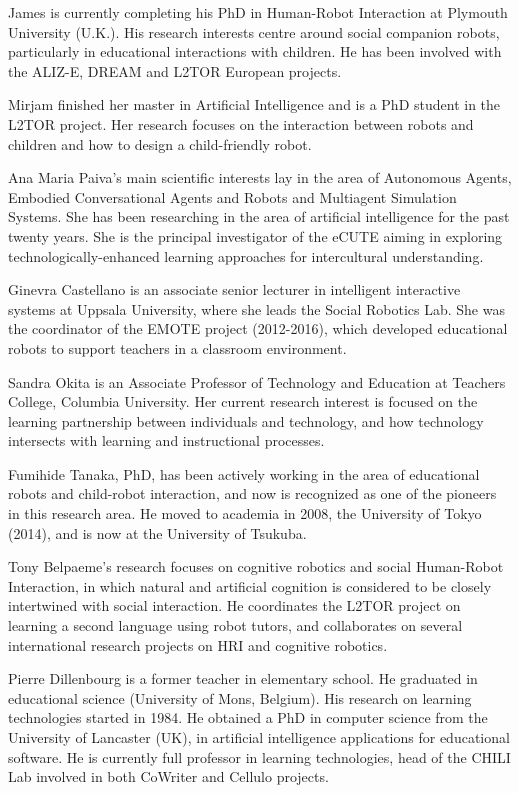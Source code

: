 \documentclass{sig-alternate-05-2015}
\begin{document}
James is currently completing his PhD in Human-Robot Interaction at Plymouth University (U.K.). His research interests centre around social companion robots, particularly in educational interactions with children. He has been involved with the ALIZ-E, DREAM and L2TOR European projects.


Mirjam finished her master in Artificial Intelligence and is a PhD student in the L2TOR project. Her research focuses on the interaction between robots and children and how to design a child-friendly robot.

Ana Maria Paiva's main scientific interests lay in the area of Autonomous Agents, Embodied Conversational Agents and Robots and Multiagent Simulation Systems. She has been researching in the area of artificial intelligence for the past twenty years. She is the principal investigator of the eCUTE aiming in exploring technologically-enhanced learning approaches for intercultural understanding.

Ginevra Castellano is an associate senior lecturer in intelligent interactive systems at Uppsala University, where she leads the Social Robotics Lab. She was the coordinator of the EMOTE project (2012-2016), which developed educational robots to support teachers in a classroom environment.


Sandra Okita is an Associate Professor of Technology and Education at Teachers College, Columbia University. Her current research interest is focused on the learning partnership between individuals and technology, and how technology intersects with learning and instructional processes.

Fumihide Tanaka, PhD,  has been actively working in the area of educational robots and child-robot interaction, and now is recognized as one of the pioneers in this research area. He moved to academia in 2008, the University of Tokyo (2014), and is now at the University of Tsukuba.

Tony Belpaeme's research focuses on cognitive robotics and social Human-Robot Interaction, in which natural and artificial cognition is considered to be closely intertwined with social interaction. He coordinates the L2TOR project on learning a second language using robot tutors, and collaborates on several international research projects on HRI and cognitive robotics.

Pierre Dillenbourg is a former teacher in elementary school. He graduated in educational science (University of Mons, Belgium). His research on learning technologies started in 1984. He obtained a PhD in computer science from the University of Lancaster (UK), in artificial intelligence applications for educational software. He is currently full professor in learning technologies, head of the CHILI Lab involved in both CoWriter and Cellulo projects.
\end{document}
